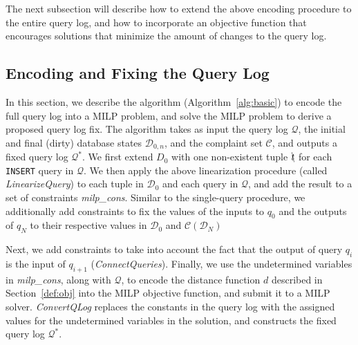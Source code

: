The next subsection will describe how to extend the above encoding procedure to the 
entire query log, and how to incorporate an objective function that encourages solutions
that minimize the amount of changes to the query log.  







\subsection{Encoding and Fixing the Query Log}
\label{sec:milp}

In this section, we describe the algorithm (Algorithm~\ref{alg:basic}) to encode 
the full query log into a MILP problem, and solve the MILP problem to derive a proposed query log fix.
The algorithm takes as input the query log $\mathcal{Q}$, the initial and final (dirty) database states 
$\mathcal{D}_{0, n}$, and the complaint set $\mathcal{C}$, and outputs a fixed query 
log $\mathcal{Q}^*$.  We first extend $D_0$ with one non-existent tuple $\bcancel{t}$
for each \texttt{INSERT} query in $\mathcal{Q}$.
We then apply the above linearization procedure (called \textit{LinearizeQuery})
to each tuple in $\mathcal{D}_0$ and each query in $\mathcal{Q}$, 
and add the result to a set of constraints \textit{milp\_cons}.
Similar to the single-query procedure, we additionally add constraints to fix the
values of the inputs to $q_0$ and the outputs of $q_N$ to their respective values in
$\mathcal{D}_0$ and $\mathcal{C}(\mathcal{D}_N)$

Next, we add constraints to take into account the fact that the output of 
query $q_i$ is the input of $q_{i+1}$ (\textit{ConnectQueries}).
Finally, we use the undetermined variables in \textit{milp\_cons}, along with $\mathcal{Q}$,
to encode the distance function $d$ described in Section~\ref{def:obj} 
into the MILP objective function, and submit it to a MILP solver.
\textit{ConvertQLog} replaces the constants in the query log with the 
assigned values for the undetermined variables in the solution, and constructs
the fixed query log $\mathcal{Q}^*$.



